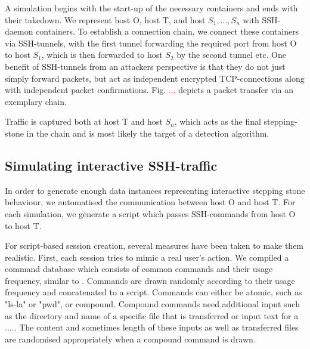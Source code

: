 \documentclass[conference]{IEEEtran}\usepackage[]{graphicx}\usepackage[]{color}
\begin{document}
A simulation begins with the start-up of the necessary containers and ends with their takedown. We represent host O, host T, and host $S_1,\dots,S_n$ with SSH-daemon containers.  To establish a connection chain, we connect these containers via SSH-tunnels, with the first tunnel forwarding the required port from host O to host $S_1$, which is then forwarded to host $S_2$ by the second tunnel etc. One benefit of SSH-tunnels from an attackers perspective is that they do not just simply forward packets, but act as independent encrypted TCP-connections along with independent packet confirmations.  Fig. \textcolor{red}{...} depicts a packet transfer via an exemplary chain. 

Traffic is captured both at host T and host $S_n$, which acts as the final stepping-stone in the chain and is most likely the target of a detection algorithm. 








\subsection{Simulating interactive SSH-traffic}\label{Sec:Simulating_interactive}

In order to generate enough data instances representing interactive stepping stone behaviour, we automatised the communication between host O and host T.  For each simulation, we generate a script which passes SSH-commands from host O to host T.

For script-based session creation, several measures have been taken to make them realistic. First, each session tries to mimic a real user's action. We compiled a command database which consists of common commands and their usage frequency, similar to \cite{xin2006testbed}.%
Commands are drawn randomly according to their usage frequency and concatenated to a script. 
Commands can either be atomic, such as "ls-la" or "pwd", or compound. Compound commands need additional input such as the directory and name of a specific file that is transferred or input text for a \textcolor{red}{....}. The content and sometimes length of these inputs as well as transferred files are randomised appropriately when a compound command is drawn. 
\end{document}
